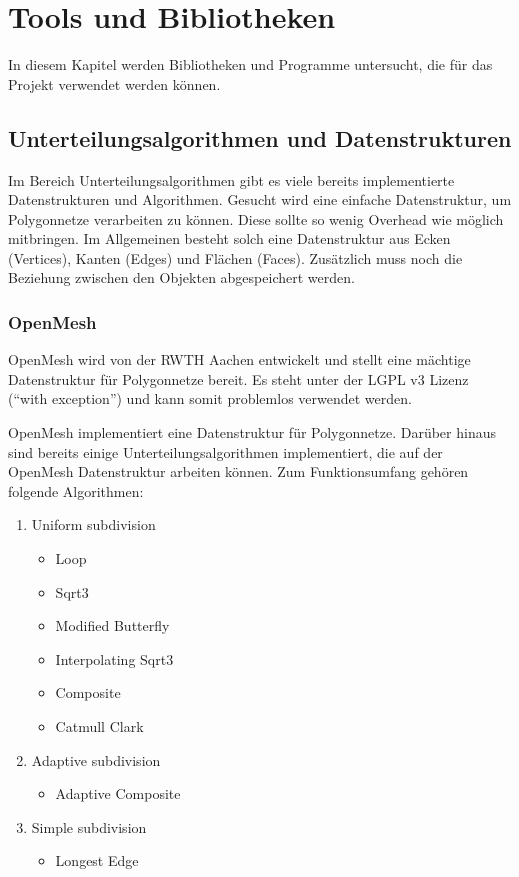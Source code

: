 \chapter{Tools und Bibliotheken}

In diesem Kapitel werden Bibliotheken und Programme untersucht, die für das Projekt verwendet werden können. 
 
\section{Unterteilungsalgorithmen und Datenstrukturen}

Im Bereich Unterteilungsalgorithmen gibt es viele bereits implementierte Datenstrukturen und Algorithmen.
Gesucht wird eine einfache Datenstruktur, um Polygonnetze verarbeiten zu können.
Diese sollte so wenig Overhead wie möglich mitbringen.
Im Allgemeinen besteht solch eine Datenstruktur aus Ecken (Vertices), Kanten (Edges) und Flächen (Faces).
Zusätzlich muss noch die Beziehung zwischen den Objekten abgespeichert werden.

\subsection{OpenMesh}

OpenMesh wird von der \ac{RWTH} Aachen entwickelt und stellt eine mächtige Datenstruktur für Polygonnetze bereit.
Es steht unter der \ac{LGPL} v3 Lizenz (\enquote{with exception}) und kann somit problemlos verwendet werden.

OpenMesh implementiert eine Datenstruktur für Polygonnetze.
Darüber hinaus sind bereits einige Unterteilungsalgorithmen implementiert, die auf der OpenMesh Datenstruktur arbeiten können.
Zum Funktionsumfang gehören folgende Algorithmen:

\begin{enumerate}
\item Uniform subdivision
\begin{itemize}
	\item Loop
	\item Sqrt3
	\item Modified Butterfly
	\item Interpolating Sqrt3
	\item Composite
	\item Catmull Clark
\end{itemize}
\item Adaptive subdivision
\begin{itemize}
	\item Adaptive Composite
\end{itemize}
\item Simple subdivision
\begin{itemize}
	\item Longest Edge
\end{itemize}
\end{enumerate}

